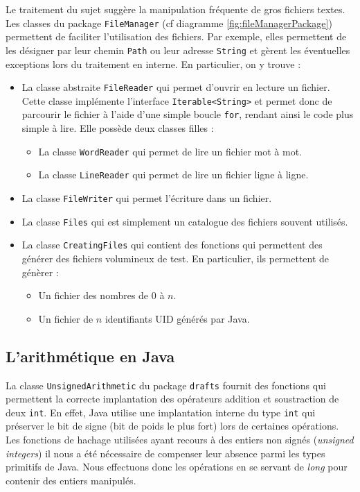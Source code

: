 \documentclass[12pt,a4paper,titlepage]{article}
\newcommand{\class}[1]{\texttt{#1}}
\begin{document}
Le traitement du sujet suggère la manipulation fréquente de gros fichiers textes.\\
Les classes du package \class{FileManager} (cf diagramme \ref{fig:fileManagerPackage}) permettent de faciliter l'utilisation des fichiers. Par exemple, elles permettent de les désigner par leur chemin \class{Path} ou leur adresse \class{String} et gèrent les éventuelles exceptions lors du traitement en interne. En particulier, on y trouve :
\begin{itemize}
\item La classe abstraite \class{FileReader} qui permet d'ouvrir en lecture un fichier.\\
	Cette classe implémente l'interface \class{Iterable<String>} et permet donc de parcourir le fichier à l'aide d'une simple boucle \class{for}, rendant ainsi le code plus simple à lire.
	Elle possède deux classes filles :
	\begin{itemize}
	\item La classe \class{WordReader} qui permet de lire un fichier mot à mot.
	\item La classe \class{LineReader} qui permet de lire un fichier ligne à ligne.
	\end{itemize}
\item La classe \class{FileWriter} qui permet l'écriture dans un fichier.
\item La classe \class{Files} qui est simplement un catalogue des fichiers souvent utilisés.
\item La classe \class{CreatingFiles} qui contient des fonctions qui permettent des générer des fichiers volumineux de test. En particulier, ils permettent de génèrer :
	\begin{itemize}
	\item Un fichier des nombres de $0$ à $n$.
	\item Un fichier de $n$ identifiants UID générés par Java.
	\end{itemize}
\end{itemize}

\subsection*{L'arithmétique en Java}
La classe \class{UnsignedArithmetic} du package \class{drafts} fournit des fonctions qui permettent la correcte implantation des opérateurs addition et soustraction de deux \class{int}. En effet, Java utilise une implantation interne du type \class{int} qui préserver le bit de signe (bit de poids le plus fort) lors de certaines opérations. Les fonctions de hachage utilisées ayant recours à des entiers non signés (\textit{unsigned integers}) il nous a été nécessaire de compenser leur absence parmi les types primitifs de Java. Nous effectuons donc les opérations en se servant de \textit{long} pour contenir des entiers manipulés.
\end{document}
